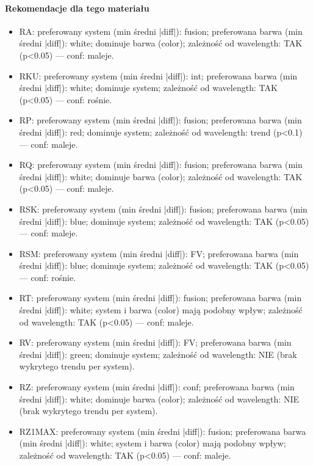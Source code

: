 \documentclass[
  10pt,
]{article}
\begin{document}
\paragraph{Rekomendacje dla tego materiału}
\begin{itemize}
\item RA: preferowany system (min średni |diff|): fusion; preferowana barwa (min średni |diff|): white; dominuje barwa (color); zależność od wavelength: TAK (p<0.05) — conf: maleje.
\item RKU: preferowany system (min średni |diff|): int; preferowana barwa (min średni |diff|): white; dominuje system; zależność od wavelength: TAK (p<0.05) — conf: rośnie.
\item RP: preferowany system (min średni |diff|): fusion; preferowana barwa (min średni |diff|): red; dominuje system; zależność od wavelength: trend (p<0.1) — conf: maleje.
\item RQ: preferowany system (min średni |diff|): fusion; preferowana barwa (min średni |diff|): white; dominuje barwa (color); zależność od wavelength: TAK (p<0.05) — conf: maleje.
\item RSK: preferowany system (min średni |diff|): fusion; preferowana barwa (min średni |diff|): blue; dominuje system; zależność od wavelength: TAK (p<0.05) — conf: maleje.
\item RSM: preferowany system (min średni |diff|): FV; preferowana barwa (min średni |diff|): blue; dominuje system; zależność od wavelength: TAK (p<0.05) — conf: rośnie.
\item RT: preferowany system (min średni |diff|): fusion; preferowana barwa (min średni |diff|): white; system i barwa (color) mają podobny wpływ; zależność od wavelength: TAK (p<0.05) — conf: maleje.
\item RV: preferowany system (min średni |diff|): FV; preferowana barwa (min średni |diff|): green; dominuje system; zależność od wavelength: NIE (brak wykrytego trendu per system).
\item RZ: preferowany system (min średni |diff|): conf; preferowana barwa (min średni |diff|): white; dominuje barwa (color); zależność od wavelength: NIE (brak wykrytego trendu per system).
\item RZ1MAX: preferowany system (min średni |diff|): fusion; preferowana barwa (min średni |diff|): white; system i barwa (color) mają podobny wpływ; zależność od wavelength: TAK (p<0.05) — conf: maleje.
\end{itemize}
\end{document}
